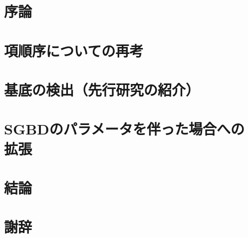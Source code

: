 





	
	

	\tableofcontents

	\chapter{序論}\label{chapter01:chapter_num}
	
	\chapter{項順序についての再考}\label{chapter02:chapter_num}

	\chapter{\groebner{}基底の検出（先行研究の紹介）}\label{chapter03:chapter_num}

	\chapter{SGBDのパラメータを伴った場合への拡張}\label{chapter04:chapter_num}

	\chapter{結論}\label{chapter05:chapter_num}
	

	\chapter*{謝辞}
	

	

